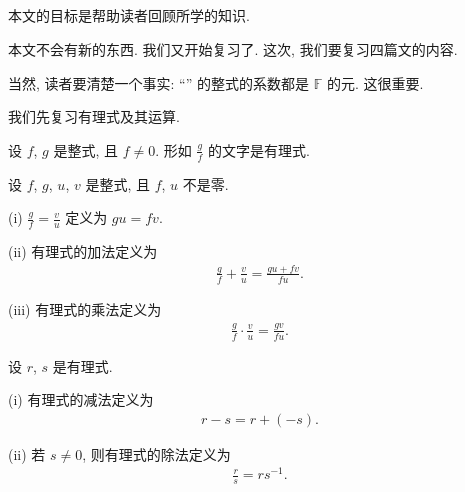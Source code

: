 \subsection*{}

本文的目标是帮助读者回顾所学的知识.

本文不会有新的东西. 我们又开始复习了. 这次, 我们要复习四篇文的内容.

当然, 读者要清楚一个事实: ``'' 的整式的系数都是 $\mathbb{F}$ 的元. 这很重要.

我们先复习有理式及其运算.

\begin{definition}
    设 $f$, $g$ 是整式, 且 $f \neq 0$. 形如 $\frac{g}{f}$ 的文字是有理式.
\end{definition}

\begin{definition}
    设 $f$, $g$, $u$, $v$ 是整式, 且 $f$, $u$ 不是零.

    (i) $\frac{g}{f} = \frac{v}{u}$ 定义为 $gu = fv$.

    (ii) 有理式的加法定义为
    \begin{align*}
        \frac{g}{f} + \frac{v}{u} = \frac{gu + fv}{fu}.
    \end{align*}

    (iii) 有理式的乘法定义为
    \begin{align*}
        \frac{g}{f} \cdot \frac{v}{u} = \frac{gv}{fu}.
    \end{align*}
\end{definition}

\begin{definition}
    设 $r$, $s$ 是有理式.

    (i) 有理式的减法定义为
    \begin{align*}
        r - s = r + (-s).
    \end{align*}

    (ii) 若 $s \neq 0$, 则有理式的除法定义为
    \begin{align*}
        \frac{r}{s} = rs^{-1}.
    \end{align*}
\end{definition}

